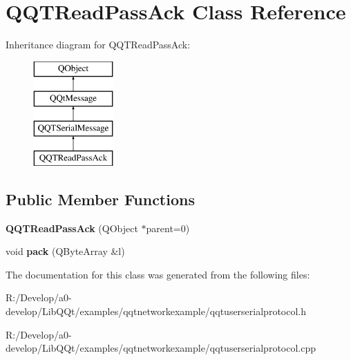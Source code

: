 \hypertarget{class_q_q_t_read_pass_ack}{}\section{Q\+Q\+T\+Read\+Pass\+Ack Class Reference}
\label{class_q_q_t_read_pass_ack}
Inheritance diagram for Q\+Q\+T\+Read\+Pass\+Ack\+:\begin{figure}[H]
\begin{center}
\leavevmode
\includegraphics[height=4.000000cm]{class_q_q_t_read_pass_ack}
\end{center}
\end{figure}
\subsection*{Public Member Functions}
\begin{DoxyCompactItemize}
\item 
\mbox{\label{class_q_q_t_read_pass_ack_a537f5f571a25fd46dafee8a358156d2c}} 
{\bfseries Q\+Q\+T\+Read\+Pass\+Ack} (Q\+Object $\ast$parent=0)
\item 
\mbox{\label{class_q_q_t_read_pass_ack_a825296eb54d9e08f62209986db9a7349}} 
void {\bfseries pack} (Q\+Byte\+Array \&l)
\end{DoxyCompactItemize}


The documentation for this class was generated from the following files\+:\begin{DoxyCompactItemize}
\item 
R\+:/\+Develop/a0-\/develop/\+Lib\+Q\+Qt/examples/qqtnetworkexample/qqtuserserialprotocol.\+h\item 
R\+:/\+Develop/a0-\/develop/\+Lib\+Q\+Qt/examples/qqtnetworkexample/qqtuserserialprotocol.\+cpp\end{DoxyCompactItemize}
